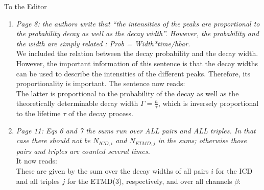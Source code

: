 \documentclass[DIN,pagenumber=false,parskip=half,fromalign=left,fromphone=true,fromemail=true,fromurl=false,fromlogo=false,fromrule=false]{scrlttr2}
\begin{document}
\begin{letter}{To the Editor}
\begin{enumerate}
\begin{enumerate}
   \item \emph{Page:
         I think the section Inner valence spectra can be skipped without losing any relevant informations.}\vspace{0.3cm}\\
         Here we disagree with the referee. The presentation and discussion of the inner valence spectra is very relevant because they form the basis for our theoretical considerations. Additionally, they provide further direct insight into the structure of our clusters. An experimentally interested reader would surely miss the information provided here.

  \end{enumerate}

  \item \emph{Page 8:
        the authors write that “the intensities of the peaks are proportional to the probability decay as well as the decay width”. However, the probability and the width are simply related : Prob =  Width*time/hbar.}\\
				
        We included the relation between the decay probability and the decay
        width. However, the important information of this sentence is that
        the decay widths can be used to describe the intensities of the
        different peaks. Therefore, its proportionality is important. The
        sentence now reads:\\
        The latter is proportional to the
probability of the decay {}
as well as the theoretically determinable
decay width $\Gamma=\frac{\hbar}{\tau}$,
which is inversely proportional to the lifetime $\tau$ of the decay process.

  \item \emph{Page 11:
        Eqs 6 and 7 the sums run over ALL pairs and ALL triples. In that case there should not be $N_{ICD,i}$ and $N_{ETMD,j}$ in the sums; otherwise those pairs and triples are counted several times.}\\
        It now reads:\\
        These are given by the sum over the decay widths of all 
        {\color{blue}{geometrically different}} pairs $i$ for the
        ICD and all {\color{blue}{geometrically different}} triples $j$
        for the ETMD(3),
        respectively, and over all channels $\beta$:


\end{enumerate}
\end{letter}
\end{document}
